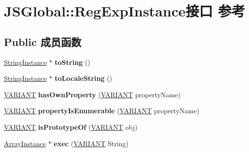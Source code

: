 \hypertarget{interface_j_s_global_1_1_reg_exp_instance}{}\section{J\+S\+Global\+:\+:Reg\+Exp\+Instance接口 参考}
\label{interface_j_s_global_1_1_reg_exp_instance}
\subsection*{Public 成员函数}
\begin{DoxyCompactItemize}
\item 
\mbox{\label{interface_j_s_global_1_1_reg_exp_instance_a52120b028f9abadf6bc4feee40177068}} 
\hyperlink{interface_j_s_global_1_1_string_instance}{String\+Instance} $\ast$ {\bfseries to\+String} ()
\item 
\mbox{\label{interface_j_s_global_1_1_reg_exp_instance_a676c6069c52529c247a808a3128046f0}} 
\hyperlink{interface_j_s_global_1_1_string_instance}{String\+Instance} $\ast$ {\bfseries to\+Locale\+String} ()
\item 
\mbox{\label{interface_j_s_global_1_1_reg_exp_instance_a75126e09a48cb9af5f75d5a307ff4eb5}} 
\hyperlink{structtag_v_a_r_i_a_n_t}{V\+A\+R\+I\+A\+NT} {\bfseries has\+Own\+Property} (\hyperlink{structtag_v_a_r_i_a_n_t}{V\+A\+R\+I\+A\+NT} property\+Name)
\item 
\mbox{\label{interface_j_s_global_1_1_reg_exp_instance_a1e74aa5832fab25c4afbb142b3874191}} 
\hyperlink{structtag_v_a_r_i_a_n_t}{V\+A\+R\+I\+A\+NT} {\bfseries property\+Is\+Enumerable} (\hyperlink{structtag_v_a_r_i_a_n_t}{V\+A\+R\+I\+A\+NT} property\+Name)
\item 
\mbox{\label{interface_j_s_global_1_1_reg_exp_instance_a497860529045ab3d7cd87ed8389e5dcb}} 
\hyperlink{structtag_v_a_r_i_a_n_t}{V\+A\+R\+I\+A\+NT} {\bfseries is\+Prototype\+Of} (\hyperlink{structtag_v_a_r_i_a_n_t}{V\+A\+R\+I\+A\+NT} obj)
\item 
\mbox{\label{interface_j_s_global_1_1_reg_exp_instance_a6ce52876e21b41877970781c6a6d63cf}} 
\hyperlink{interface_j_s_global_1_1_array_instance}{Array\+Instance} $\ast$ {\bfseries exec} (\hyperlink{structtag_v_a_r_i_a_n_t}{V\+A\+R\+I\+A\+NT} String)
\end{DoxyCompactItemize}
